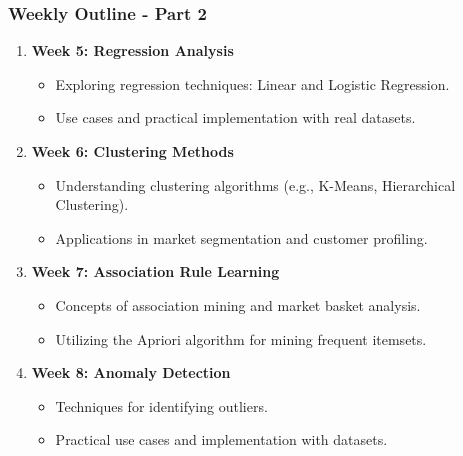 \documentclass[aspectratio=169]{beamer}
\begin{document}
\begin{frame}[fragile]
    \frametitle{Weekly Outline - Part 2}
    \begin{enumerate}[resume]
        \item \textbf{Week 5: Regression Analysis}
            \begin{itemize}
                \item Exploring regression techniques: Linear and Logistic Regression.
                \item Use cases and practical implementation with real datasets.
            \end{itemize}
        \item \textbf{Week 6: Clustering Methods}
            \begin{itemize}
                \item Understanding clustering algorithms (e.g., K-Means, Hierarchical Clustering).
                \item Applications in market segmentation and customer profiling.
            \end{itemize}
        \item \textbf{Week 7: Association Rule Learning}
            \begin{itemize}
                \item Concepts of association mining and market basket analysis.
                \item Utilizing the Apriori algorithm for mining frequent itemsets.
            \end{itemize}
        \item \textbf{Week 8: Anomaly Detection}
            \begin{itemize}
                \item Techniques for identifying outliers.
                \item Practical use cases and implementation with datasets.
            \end{itemize}
    \end{enumerate}
\end{frame}
\end{document}
